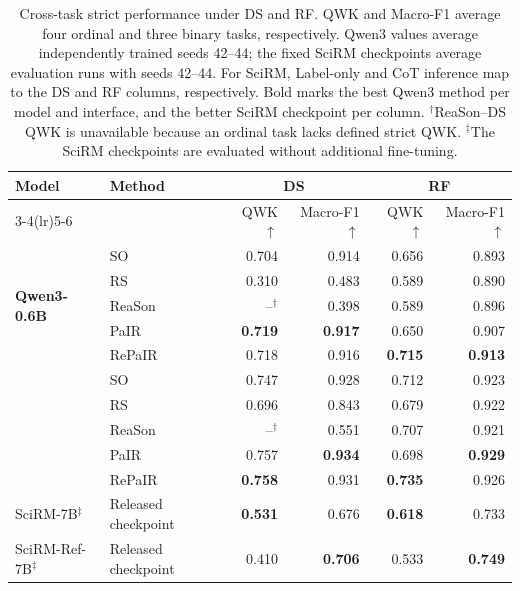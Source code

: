 \begin{table}[!t]
\centering
\small
\setlength{\tabcolsep}{8pt}
\renewcommand{\arraystretch}{1.08}
\begin{tabular*}{\textwidth}{@{\extracolsep{\fill}}llrrrr@{}}
\toprule
\multirow{2}{*}{Model} & \multirow{2}{*}{Method}
& \multicolumn{2}{c}{DS} & \multicolumn{2}{c}{RF} \\
\cmidrule(lr){3-4}\cmidrule(lr){5-6}
& & QWK $\uparrow$ & Macro-F1 $\uparrow$
  & QWK $\uparrow$ & Macro-F1 $\uparrow$ \\
\midrule
\multirow{5}{*}{\textbf{Qwen3-0.6B}}
& SO     & 0.704 & 0.914 & 0.656 & 0.893 \\
& RS     & 0.310 & 0.483 & 0.589 & 0.890 \\
& ReaSon & --$^{\dagger}$ & 0.398 & 0.589 & 0.896 \\
& PaIR   & \textbf{0.719} & \textbf{0.917} & 0.650 & 0.907 \\
& RePaIR & 0.718 & 0.916 & \textbf{0.715} & \textbf{0.913} \\
\addlinespace[2pt]
\midrule
\multirow{5}{*}{\textbf{Qwen3-4B}}
& SO     & 0.747 & 0.928 & 0.712 & 0.923 \\
& RS     & 0.696 & 0.843 & 0.679 & 0.922 \\
& ReaSon & --$^{\dagger}$ & 0.551 & 0.707 & 0.921 \\
& PaIR   & 0.757 & \textbf{0.934} & 0.698 & \textbf{0.929} \\
& RePaIR & \textbf{0.758} & 0.931 & \textbf{0.735} & 0.926 \\
\addlinespace[2pt]
\midrule
SciRM-7B$^{\ddagger}$ & Released checkpoint
& \textbf{0.531} & 0.676 & \textbf{0.618} & 0.733 \\
SciRM-Ref-7B$^{\ddagger}$ & Released checkpoint
& 0.410 & \textbf{0.706} & 0.533 & \textbf{0.749} \\
\bottomrule
\end{tabular*}
\caption{Cross-task strict performance under DS and RF. QWK and Macro-F1
average four ordinal and three binary tasks, respectively. Qwen3 values
average independently trained seeds 42--44; the fixed SciRM checkpoints
average evaluation runs with seeds 42--44. For SciRM, Label-only and CoT
inference map to the DS and RF columns, respectively. Bold marks the best
Qwen3 method per model and interface, and the better SciRM checkpoint per
column. $^{\dagger}$ReaSon--DS QWK is unavailable because an ordinal task lacks
defined strict QWK. $^{\ddagger}$The SciRM checkpoints are evaluated without
additional fine-tuning.}
\label{tab:model-scale-summary}
\end{table}

